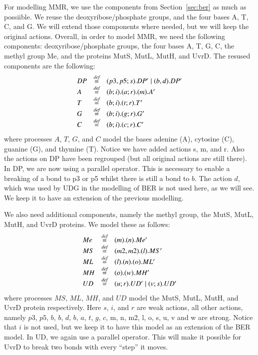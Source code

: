 \documentclass[review]{elsarticle}
\newcommand{\paral}{\; \vert \;}
\newcommand{\bydef}{\stackrel{\emph{def}}{=}}
\begin{document}
For modelling MMR, we use the components from Section~\ref{sec:ber} as much as possiible. We reuse the deoxyribose/phosphate groups, and the four bases A, T, C, and G. We will extend those components where needed, but we will keep the original actions. Overall, in order to model MMR, we need the following components: deoxyribose/phosphate groups, the four bases A, T, G, C, the methyl group Me, and the proteins MutS, MutL, MutH, and UvrD. The resused components are the following:
%
$$\begin{array}{lll}
DP & \bydef & (p3,p5;s).DP' \paral (b,d).DP'\\
A & \bydef & (b;i).(a;r).(m).A'\\
T & \bydef & (b;i).(t;r).T'\\
G & \bydef & (b;i).(g;r).G'\\
C & \bydef & (b;i).(c;r).C'\\
\end{array}$$
%
where processes $A$, $T$, $G$, and $C$ model the bases adenine (A), cytosine (C), guanine (G), and thymine (T). Notice we have added actions s, m, and r. Also the actions on DP have been regrouped (but all original actions are still there). In DP, we are now using a parallel operator. This is necessary to enable a breaking of a bond to p3 or p5 whilst there is still a bond to $b$. The action $d$, which was used by UDG in the modelling of BER is not used here, as we will see. We keep it to have an extension of the previous modelling.

We also need additional components, namely the methyl group, the MutS, MutL, MutH, and UvrD proteins. We model these as follows:
$$\begin{array}{lll}
Me & \bydef & (m).(n).Me'\\
MS & \bydef & (m2,m2).(l).MS'\\
ML & \bydef & (l).(n).(o).ML'\\
MH & \bydef & (o).(w).MH'\\
UD & \bydef & (u;r).UD' \paral (v;s).UD'\\
\end{array}$$
%
where processes $MS$, $ML$, $MH$, and $UD$ model the MutS, MutL, MutH, and UvrD protein respectively.  Here $s$, $i$, and $r$ are weak actions, all other actions, namely $p3$, $p5$, $b$, $b$, $d$, $b$, $a$, $t$, $g$, $c$, m, n, m2, l, o, s, u, v and w are strong. Notice that $i$ is not used, but we keep it to have this model as an extension of the BER model. In UD, we again use a  parallel operator. This will make it possible for UvrD to break two bonds with every ``step'' it moves.
\end{document}
